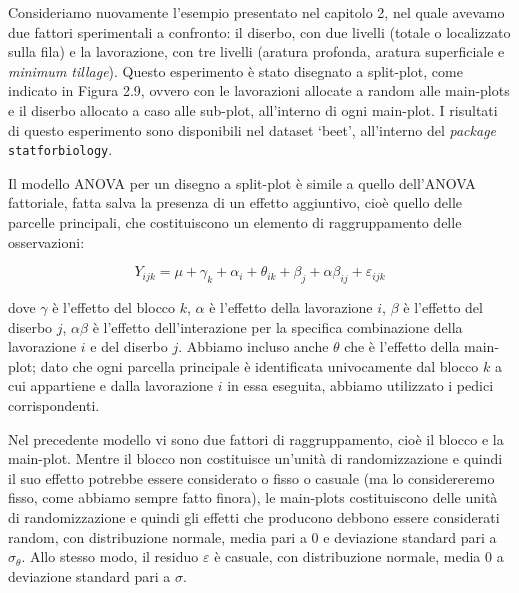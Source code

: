 \documentclass[
  12pt,
]{book}
\begin{document}
Consideriamo nuovamente l'esempio presentato nel capitolo 2, nel quale avevamo due fattori sperimentali a confronto: il diserbo, con due livelli (totale o localizzato sulla fila) e la lavorazione, con tre livelli (aratura profonda, aratura superficiale e \emph{minimum tillage}). Questo esperimento è stato disegnato a split-plot, come indicato in Figura 2.9, ovvero con le lavorazioni allocate a random alle main-plots e il diserbo allocato a caso alle sub-plot, all'interno di ogni main-plot. I risultati di questo esperimento sono disponibili nel dataset `beet', all'interno del \emph{package} \texttt{statforbiology}.

Il modello ANOVA per un disegno a split-plot è simile a quello dell'ANOVA fattoriale, fatta salva la presenza di un effetto aggiuntivo, cioè quello delle parcelle principali, che costituiscono un elemento di raggruppamento delle osservazioni:

\[Y_{ijk} = \mu + \gamma_k + \alpha_i + \theta_{ik} + \beta_j + \alpha\beta_{ij} + \varepsilon_{ijk}\]

dove \(\gamma\) è l'effetto del blocco \(k\), \(\alpha\) è l'effetto della lavorazione \(i\), \(\beta\) è l'effetto del diserbo \(j\), \(\alpha\beta\) è l'effetto dell'interazione per la specifica combinazione della lavorazione \(i\) e del diserbo \(j\). Abbiamo incluso anche \(\theta\) che è l'effetto della main-plot; dato che ogni parcella principale è identificata univocamente dal blocco \(k\) a cui appartiene e dalla lavorazione \(i\) in essa eseguita, abbiamo utilizzato i pedici corrispondenti.

Nel precedente modello vi sono due fattori di raggruppamento, cioè il blocco e la main-plot. Mentre il blocco non costituisce un'unità di randomizzazione e quindi il suo effetto potrebbe essere considerato o fisso o casuale (ma lo considereremo fisso, come abbiamo sempre fatto finora), le main-plots costituiscono delle unità di randomizzazione e quindi gli effetti che producono debbono essere considerati random, con distribuzione normale, media pari a 0 e deviazione standard pari a \(\sigma_{\theta}\). Allo stesso modo, il residuo \(\varepsilon\) è casuale, con distribuzione normale, media 0 a deviazione standard pari a \(\sigma\).
\end{document}
